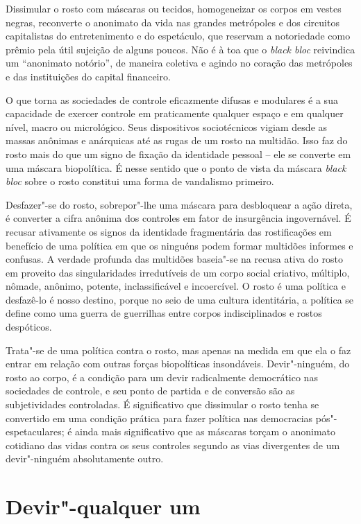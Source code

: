 Dissimular o rosto com máscaras ou tecidos, homogeneizar os corpos em
vestes negras, reconverte o anonimato da vida nas grandes metrópoles e
dos circuitos capitalistas do entretenimento e do espetáculo, que
reservam a notoriedade como prêmio pela útil sujeição de alguns poucos.
Não é à toa que o \emph{black bloc }reivindica um ``anonimato
notório'', de maneira coletiva e agindo no coração das metrópoles
e das instituições do capital financeiro.

O que torna as sociedades de controle eficazmente difusas e modulares é
a sua capacidade de exercer controle em praticamente qualquer espaço e
em qualquer nível, macro ou micrológico. Seus dispositivos sociotécnicos
vigiam desde as massas anônimas e anárquicas até as rugas de um rosto na
multidão. Isso faz do rosto mais do que um signo de fixação da
identidade pessoal -- ele se converte em uma máscara biopolítica. É
nesse sentido que o ponto de vista da máscara \emph{black bloc} sobre o
rosto constitui uma forma de vandalismo primeiro.

Desfazer"-se do rosto, sobrepor"-lhe uma máscara para desbloquear a ação
direta, é converter a cifra anônima dos controles em fator de
insurgência ingovernável. É recusar ativamente os signos da identidade
fragmentária das rostificações em benefício de uma política em que os
ninguéns podem formar multidões informes e confusas. A verdade profunda
das multidões baseia"-se na recusa ativa do rosto em proveito das
singularidades irredutíveis de um corpo social criativo, múltiplo,
nômade, anônimo, potente, inclassificável e incoercível. O rosto é uma
política e desfazê-lo é nosso destino, porque no seio de uma cultura
identitária, a política se define como uma guerra de guerrilhas entre
corpos indisciplinados e rostos despóticos.

Trata"-se de uma política contra o rosto, mas apenas na medida em que ela
o faz entrar em relação com outras forças biopolíticas insondáveis.
Devir"-ninguém, do rosto ao corpo, é a condição para um devir
radicalmente democrático nas sociedades de controle, e seu ponto de
partida e de conversão são as subjetividades controladas. É
significativo que dissimular o rosto tenha se convertido em uma condição
prática para fazer política nas democracias pós"-espetaculares; é ainda
mais significativo que as máscaras torçam o anonimato cotidiano das
vidas contra os seus controles segundo as vias divergentes de um
devir"-ninguém absolutamente outro.

\section{Devir"-qualquer um}

